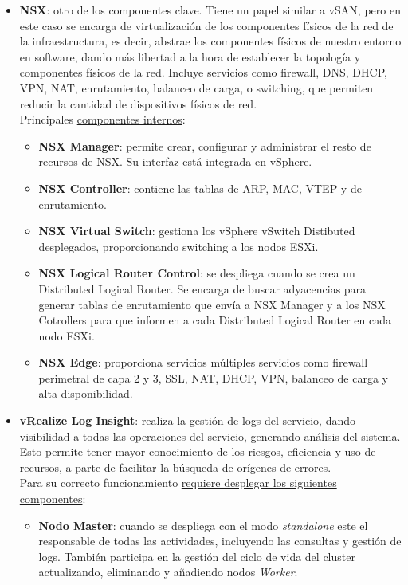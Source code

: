 \begin{itemize}
    \item \textbf{NSX}: otro de los componentes clave. Tiene un papel similar a vSAN, pero en este caso se encarga de virtualización de los componentes físicos de la red de la infraestructura, es decir, abstrae los componentes físicos de nuestro entorno en software, dando más libertad a la hora de establecer la topología y componentes físicos de la red. Incluye servicios como firewall, DNS, DHCP, VPN, NAT, enrutamiento, balanceo de carga, o switching, que permiten reducir la cantidad de dispositivos físicos de red.\\
    Principales \underline{componentes internos}\cite{componentesNSX}:
    \begin{itemize}
        \item \textbf{NSX Manager}: permite crear, configurar y administrar el resto de recursos de NSX. Su interfaz está integrada en vSphere.
        \item \textbf{NSX Controller}: contiene las tablas de ARP, MAC, VTEP y de enrutamiento.
        \item \textbf{NSX Virtual Switch}: gestiona los vSphere vSwitch Distibuted desplegados, proporcionando switching a los nodos ESXi.
        \item \textbf{NSX Logical Router Control}: se despliega cuando se crea un Distributed Logical Router. Se encarga de buscar adyacencias para generar tablas de enrutamiento que envía a NSX Manager y a los NSX Cotrollers para que informen a cada Distributed Logical Router en cada nodo ESXi.
        \item \textbf{NSX Edge}: proporciona servicios múltiples servicios como firewall perimetral de capa 2 y 3, SSL, NAT, DHCP, VPN, balanceo de carga y alta disponibilidad.
    \end{itemize}
    \item \textbf{vRealize Log Insight}: realiza la gestión de logs del servicio, dando visibilidad a todas las operaciones del servicio, generando análisis del sistema. Esto permite tener mayor conocimiento de los riesgos, eficiencia y uso de recursos, a parte de facilitar la búsqueda de orígenes de errores.\\
    Para su correcto funcionamiento \underline{requiere desplegar los siguientes componentes}:
    \begin{itemize}
        \item \textbf{Nodo Master}: cuando se despliega con el modo \textit{standalone} este el responsable de todas las actividades, incluyendo las consultas y gestión de logs. También participa en la gestión del ciclo de vida del cluster actualizando, eliminando y añadiendo nodos \textit{Worker}. 

\end{itemize}
\end{itemize}
